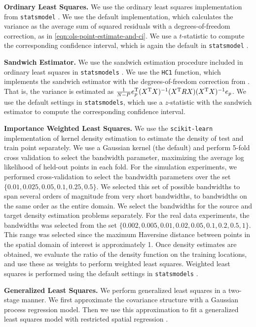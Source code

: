 \textbf{Ordinary Least Squares.}
We use the ordinary least squares implementation from \texttt{statsmodel} \citep{seabold2010statsmodels}. We use the default implementation, which calculates the variance as the average sum of squared residuals with a degrees-of-freedom correction, as in \cref{eqn:ols-point-estimate-and-ci}. We use a $t$-statistic to compute the corresponding confidence interval, which is again the default in \texttt{statsmodel} \citep{seabold2010statsmodels}.

\textbf{Sandwich Estimator.}
We use the sandwich estimation procedure included in ordinary least squares in \texttt{statsmodels}  \citep{seabold2010statsmodels}. We use the \texttt{HC1} function, which implements the sandwich estimator with the degrees-of-freedom correction from \citet{Hinkley_1977_Jacknifing,MACKINNON1985305}. That is, the variance is estimated as $\frac{1}{N-P}e_p^{\mathrm{T}}(X^{\mathrm{T}}X)^{-1}(X^{\mathrm{T}}RX)(X^{\mathrm{T}}X)^{-1}e_p$. We use the default settings in \texttt{statsmodels}, which use a $z$-statistic with the sandwich estimator to compute the corresponding confidence interval.

\textbf{Importance Weighted Least Squares.}
We use the \texttt{scikit-learn} \citep{scikit-learn} implementation of kernel density estimation to estimate the density of test and train point separately. We use a Gaussian kernel (the default) and perform 5-fold cross validation to select the bandwidth parameter, maximizing the average log likelihood of held-out points in each fold. For the simulation experiments, we performed cross-validation to select the bandwidth parameters over the set $\{0.01, 0.025, 0.05, 0.1, 0.25, 0.5\}$. We selected this set of possible bandwidths to span several orders of magnitude from very short bandwidths, to bandwidths on the same order as the entire domain. We select the bandwidths for the source and target density estimation problems separately. For the real data experiments, the bandwidths was selected from the set $\{0.002, 0.005, 0.01, 0.02, 0.05, 0.1, 0.2, 0.5, 1\}$. This range was selected since the maximum Haversine distance between points in the spatial domain of interest is approximately 1. Once density estimates are obtained, we evaluate the ratio of the density function on the training locations, and use these as weights to perform weighted least squares. Weighted least squares is performed using the default settings in \texttt{statsmodels} \citep{seabold2010statsmodels}.

\textbf{Generalized Least Squares.}
We perform generalized least squares in a two-stage manner. We first approximate the covariance structure with a Gaussian process regression model. Then we use this approximation to fit a generalized least squares model with restricted spatial regression \citep{hodges2010adding}.

